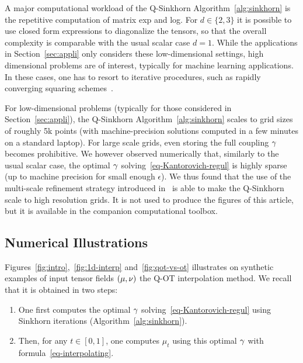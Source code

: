 

\begin{rem}
A major computational workload of the Q-Sinkhorn Algorithm~\ref{alg:sinkhorn} is the repetitive computation of matrix exp and log. 
%
For $d \in \{2,3\}$ it is possible to use closed form expressions to diagonalize the tensors, so that the overall complexity is comparable with the usual scalar case $d=1$.
%
While the applications in Section~\ref{sec:appli} only considers these low-dimensional settings, high dimensional problems are of interest, typically for machine learning applications.  In these cases, one has to resort to iterative procedures, such as rapidly converging squaring schemes~\cite{HighamExp,HighamLog}.
\end{rem}

\begin{rem}
For low-dimensional problems (typically for those considered in Section~\ref{sec:appli}), the Q-Sinkhorn Algorithm~\ref{alg:sinkhorn} scales to grid sizes of roughly 5k points (with machine-precision solutions computed in a few minutes on a standard laptop).
%
For large scale grids, even storing the full coupling $\gamma$ becomes prohibitive. We however observed numerically that, similarly  to the usual scalar case, the optimal $\gamma$ solving~\eqref{eq-Kantorovich-regul} is highly sparse (up to machine precision for small enough $\epsilon$).
% 
We thus found that the use of the multi-scale refinement strategy introduced in~\cite{Schmitzer2016} is able to make the Q-Sinkhorn scale to high resolution grids.  It is not used to produce the figures of this article, but it is available in the companion computational toolbox.
\end{rem}

\subsection{Numerical Illustrations}
\label{sec-numerics-interp}

Figures~\ref{fig:intro},~\ref{fig:1d-interp} and~\ref{fig:qot-vs-ot} illustrates on synthetic examples of input tensor fields $(\mu,\nu)$ the Q-OT interpolation method. 
%
We recall that it is obtained in two steps:
\begin{enumerate}
	\item One first computes the optimal $\gamma$ solving~\eqref{eq-Kantorovich-regul} using Sinkhorn iterations (Algorithm~\ref{alg:sinkhorn}).
	\item Then, for any $t \in [0,1]$, one computes $\mu_t$ using this optimal $\gamma$ with formula~\eqref{eq-interpolating}.
\end{enumerate}
   
